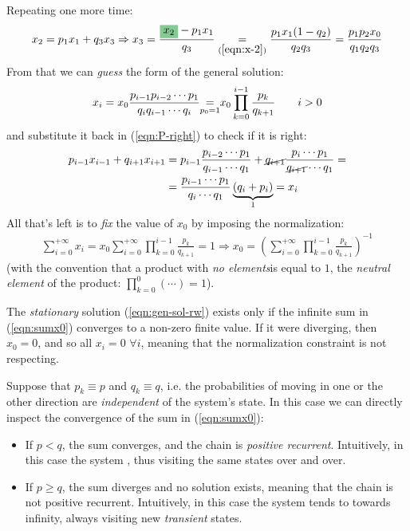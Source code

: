 \documentclass[../template.tex]{subfiles}
\begin{document}
\begin{example}
Repeating one more time:
\begin{align*}
    x_2 = p_1 x_1 + q_3 x_3 \Rightarrow x_3 = \frac{\hlc{ForestGreen}{x_2} - p_1 x_1}{q_3} \underset{(\ref{eqn:x-2})}{=}  \frac{p_1 x_1 (1-q_2)}{q_2 q_3}  = \frac{p_1 p_2 x_0}{q_1 q_2 q_3}  
\end{align*}
From that we can \textit{guess}  the form of the general solution:
\begin{align}\label{eqn:gen-sol-rw}
    x_i = x_0 \frac{p_{i-1} p_{i-2} \cdots p_1}{q_i q_{i-1} \cdots q_i}\> \underset{\mathclap{p_0=1}}{=}\>  x_0 \prod_{k=0}^{i-1} \frac{p_k}{q_{k+1}} \qquad i > 0
\end{align}
and substitute it back in (\ref{eqn:P-right}) to check if it is right:
\begin{align*}
    p_{i-1} x_{i-1} + q_{i+1} x_{i+1} &= p_{i-1} \frac{p_{i-2} \cdots p_1}{q_{i-1} \cdots q_1} + \cancel{q_{i+1}} \frac{p_i \cdots p_1}{\cancel{q_{i+1}} \cdots q_1}  =\\
    &= \frac{p_{i-1} \cdots p_1}{q_i \cdots q_1} \underbrace{(q_i + p_i)}_{1} = x_i
\end{align*}
All that's left is to \textit{fix} the value of $x_0$ by imposing the normalization:
\begin{align}\label{eqn:x0}
    \sum_{i=0}^{+\infty} x_i = x_0 \sum_{i=0}^{+\infty} \prod_{k=0}^{i-1} \frac{p_k}{q_{k+1}}  = 1 \Rightarrow x_0 = \left(\sum_{i=0}^{+\infty} \prod_{k=0}^{i-1} \frac{p_k}{q_{k+1}} \right)^{-1}
\end{align} 
(with the convention that a product with \textit{no elements}is equal to $1$, the \textit{neutral element} of the product: $\prod_{k=0}^{0} (\cdots) = 1$). 

\medskip

The \textit{stationary} solution  (\ref{eqn:gen-sol-rw}) exists only if the infinite sum in (\ref{eqn:sumx0}) converges to a non-zero finite value. If it were diverging, then $x_0 = 0$, and so all $x_i = 0$ $\forall i$, meaning that the normalization constraint is not respecting.

\medskip

Suppose that $p_k \equiv p$ and $q_k \equiv q$, i.e. the probabilities of moving in one or the other direction are \textit{independent} of the system's state. In this case we can directly inspect the convergence of the sum in (\ref{eqn:sumx0}):
\begin{itemize}%
    \item If $p < q$, the sum converges, and the chain is \textit{positive recurrent}. Intuitively, in this case the system , thus visiting the same states over and over.
    \item If $p \geq q$, the sum diverges and no solution exists, meaning that the chain is not positive recurrent. Intuitively, in this case the system tends to  towards infinity, always visiting new \textit{transient} states.  
\end{itemize}
\end{example}
\end{document}
